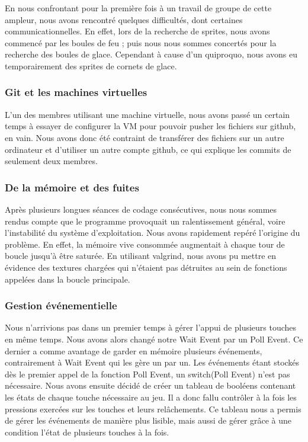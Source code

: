 En nous confrontant pour la première fois à un travail de groupe de cette ampleur, nous avons rencontré quelques difficultés, dont certaines communicationnelles. En effet, lors de la recherche de sprites, nous avons commencé par les boules de feu ; puis nous nous sommes concertés pour la recherche des boules de glace. Cependant à cause d'un quiproquo, nous avons eu temporairement des sprites de cornets de glace.

	\subsubsection{Git et les machines virtuelles}
	L'un des membres utilisant une machine virtuelle, nous avons passé un certain temps à essayer de configurer la VM pour pouvoir pusher les fichiers sur github, en vain. Nous avons donc été contraint de transférer des fichiers sur un autre ordinateur et d'utiliser un autre compte github, ce qui explique les commits de seulement deux membres.

	\subsubsection{De la mémoire et des fuites}

Après plusieurs longues séances de codage consécutives, nous nous sommes rendus compte que le programme provoquait un ralentissement général, voire l'instabilité du système d'exploitation. Nous avons rapidement repéré l'origine du problème. En effet, la mémoire vive consommée augmentait à chaque tour de boucle jusqu'à être saturée. En utilisant valgrind, nous avons pu mettre en évidence des textures chargées qui n'étaient pas détruites au sein de fonctions appelées dans la boucle principale.

	\subsubsection{Gestion événementielle}
	
	Nous n'arrivions pas dans un premier temps à gérer l'appui de plusieurs touches en même temps. Nous avons alors changé notre Wait Event par un Poll Event. Ce dernier a comme avantage de garder en mémoire plusieurs événements, contrairement à Wait Event qui les gère un par un. Les événements étant stockés dès le premier appel de la fonction Poll Event, un switch(Poll Event) n'est pas nécessaire. Nous avons ensuite décidé de créer un tableau de booléens contenant les états de chaque touche nécessaire au jeu. Il a donc fallu contrôler à la fois les pressions exercées sur les touches et leurs relâchements. Ce tableau nous a permis de gérer les événements de manière plus lisible, mais aussi de gérer grâce à une condition l'état de plusieurs touches à la fois. 

